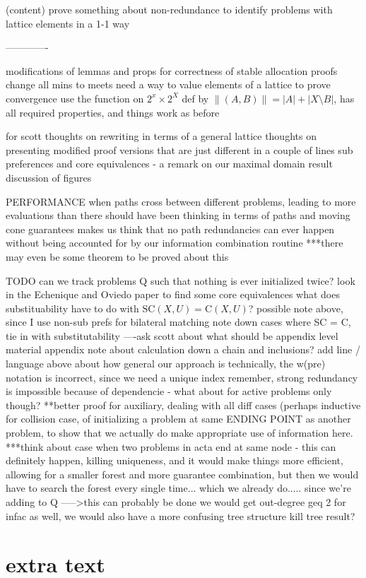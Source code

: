 \documentclass[11pt,reqno]{amsart}
\theoremstyle{definition}
\numberwithin{equation}{section}
\newcommand{\strcore}{\mathrm{SC}(X,U)}
\newcommand{\core}{\mathrm{C}(X,U)}
\begin{document}
(content)
prove something about non-redundance to identify problems with lattice elements in a 1-1 way

-------------

modifications of lemmas and props for correctness of stable allocation proofs
    change all mins to meets
    need a way to value elements of a lattice to prove convergence 
    use the function on $2^x \times 2^X$ def by $\|(A,B) \| = |A| + |X \setminus B|$, has all required properties, and things work as before

for scott 
    thoughts on rewriting in terms of a general lattice
    thoughts on presenting modified proof versions that are just different in a couple of lines
    sub preferences and core equivalences - a remark on our maximal domain result
    discussion of figures 

PERFORMANCE 
    when paths cross between different problems, leading to more evaluations than there should have been
    thinking in terms of paths and moving cone guarantees makes us think that no path redundancies can ever happen without being accounted for by our information combination routine
    ***there may even be some theorem to be proved about this


TODO
can we track problems Q such that nothing is ever initialized twice? 
look in the Echenique and Oviedo paper to find some core equivalences
what does substituability have to do with $\strcore = \core$?
    possible note above, since I use non-sub prefs for bilateral matching
note down cases where SC = C, tie in with substitutability
----ask scott about what should be appendix level material 
appendix note about calculation down a chain and inclusions?
add line / language above about how general our approach is
technically, the w(pre) notation is incorrect, since we need a unique index
remember, strong redundancy is impossible because of dependencie - what about for active problems only though?
**better proof for auxiliary, dealing with all diff cases (perhaps inductive for collision case, of initializing a problem at same ENDING POINT as another problem, to show that we actually do make appropriate use of information here.
***think about case when two problems in acta end at same node - this can definitely happen, killing uniqueness, and it would make things more efficient, allowing for a smaller forest and more guarantee combination, but then we would have to search the forest every single time... which we already do..... since we're adding to Q
    ----->this can probably be done
    we would get out-degree geq 2 for infac as well, we would also have a more confusing tree structure
    kill tree result?

\section{extra text} 
\end{document}
